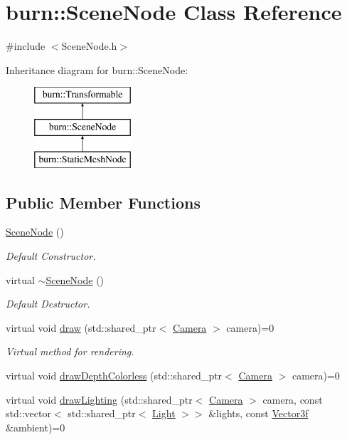 \hypertarget{classburn_1_1_scene_node}{\section{burn\-:\-:Scene\-Node Class Reference}
\label{classburn_1_1_scene_node}
}


{\ttfamily \#include $<$Scene\-Node.\-h$>$}

Inheritance diagram for burn\-:\-:Scene\-Node\-:\begin{figure}[H]
\begin{center}
\leavevmode
\includegraphics[height=3.000000cm]{classburn_1_1_scene_node}
\end{center}
\end{figure}
\subsection*{Public Member Functions}
\begin{DoxyCompactItemize}
\item 
\hyperlink{classburn_1_1_scene_node_a107d42062677132d1104391fd2bf2530}{Scene\-Node} ()
\begin{DoxyCompactList}\small\item\em Default Constructor. \end{DoxyCompactList}\item 
virtual \hyperlink{classburn_1_1_scene_node_aa651409167ec065930115c8b31057e35}{$\sim$\-Scene\-Node} ()
\begin{DoxyCompactList}\small\item\em Default Destructor. \end{DoxyCompactList}\item 
virtual void \hyperlink{classburn_1_1_scene_node_a11a0695c2c0381824d6bf3e4518371bd}{draw} (std\-::shared\-\_\-ptr$<$ \hyperlink{classburn_1_1_camera}{Camera} $>$ camera)=0
\begin{DoxyCompactList}\small\item\em Virtual method for rendering. \end{DoxyCompactList}\item 
virtual void \hyperlink{classburn_1_1_scene_node_aba5cd67bf31709472a4a7d85804fd8bb}{draw\-Depth\-Colorless} (std\-::shared\-\_\-ptr$<$ \hyperlink{classburn_1_1_camera}{Camera} $>$ camera)=0
\item 
virtual void \hyperlink{classburn_1_1_scene_node_a39a9e949313f6e1131825e43ce1d22a5}{draw\-Lighting} (std\-::shared\-\_\-ptr$<$ \hyperlink{classburn_1_1_camera}{Camera} $>$ camera, const std\-::vector$<$ std\-::shared\-\_\-ptr$<$ \hyperlink{classburn_1_1_light}{Light} $>$$>$ \&lights, const \hyperlink{namespaceburn_a9d6d349c94bc4dc9699427216128a0ef}{Vector3f} \&ambient)=0
\end{DoxyCompactItemize}
